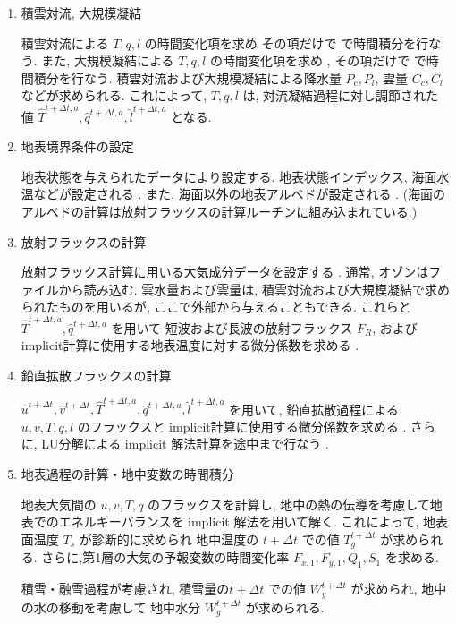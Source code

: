 \begin{enumerate}
\begin{enumerate}
\item 積雲対流, 大規模凝結 

積雲対流による $T, q, l$ の時間変化項を求め 
その項だけで  で時間積分を行なう.
また, 大規模凝結による $T, q, l$ の時間変化項を求め ,
その項だけで  で時間積分を行なう.
積雲対流および大規模凝結による降水量 $P_c, P_l$, 
雲量 $C_c, C_l$ などが求められる.
これによって, $T, q, l$ は,
対流凝結過程に対し調節された値
$\hat{T}^{t+\Delta t,a}, 
\hat{q}^{t+\Delta t,a}, \hat{l}^{t+\Delta t,a}$ 
となる.

\item 地表境界条件の設定 

地表状態を与えられたデータにより設定する.
地表状態インデックス, 海面水温などが設定される .
また, 海面以外の地表アルベドが設定される .
(海面のアルベドの計算は放射フラックスの計算ルーチンに組み込まれている.)

\item 放射フラックスの計算 

放射フラックス計算に用いる大気成分データを設定する .
通常, オゾンはファイルから読み込む.
雲水量および雲量は, 積雲対流および大規模凝結で求められたものを用いるが,
ここで外部から与えることもできる.
これらと $\hat{T}^{t+\Delta t,a}, \hat{q}^{t+\Delta t,a}$ を用いて
短波および長波の放射フラックス $F_R$, および
implicit計算に使用する地表温度に対する微分係数を求める .

\item 鉛直拡散フラックスの計算 

$\hat{u}^{t+\Delta t}, \hat{v}^{t+\Delta t}, 
\hat{T}^{t+\Delta t,a}, \hat{q}^{t+\Delta t,a}, \hat{l}^{t+\Delta t,a}$ 
を用いて,
鉛直拡散過程による $u, v, T, q, l$ のフラックスと
implicit計算に使用する微分係数を求める .
さらに, LU分解による implicit 解法計算を途中まで行なう .

\item 地表過程の計算・地中変数の時間積分 

地表大気間の  $u, v, T, q $ のフラックスを計算し,
地中の熱の伝導を考慮して地表でのエネルギーバランスを
implicit 解法を用いて解く.
これによって, 地表面温度 $T_s$ が診断的に求められ
地中温度の $t+\Delta t$ での値
$T_g^{t+\Delta t}$
が求められる.
さらに,第1層の大気の予報変数の時間変化率
$F_{x,1}, F_{y,1}, Q_1, S_1$ を求める.

積雪・融雪過程が考慮され, 
積雪量の$t+\Delta t$ での値 $W_y^{t+\Delta t}$ が求められ,
地中の水の移動を考慮して
地中水分 $W_g^{t+\Delta t}$ が求められる.


\end{enumerate}
\end{enumerate}
